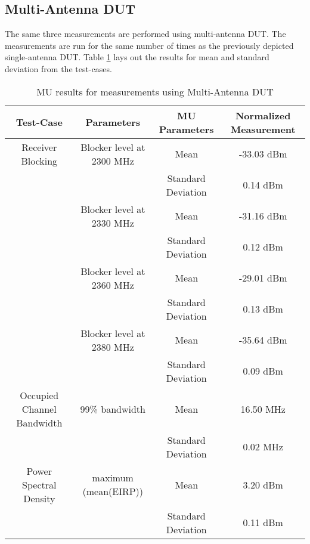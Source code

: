 \subsection{Multi-Antenna \acs{DUT}}
The same three measurements are performed using multi-antenna \acs{DUT}. The measurements are run for the same number of times as the previously depicted single-antenna \acs{DUT}. Table \ref{tab:Tab4} lays out the results for mean and standard deviation from the test-cases.
\begin{table}[H]
\resizebox{\textwidth}{!}
{
        \begin{tabular}{|c|c|c|c|}\toprule
         \textbf{Test-Case} & Parameters & \textbf{MU Parameters} & \textbf{Normalized Measurement} \\
            \midrule
           Receiver Blocking & Blocker level at 2300 MHz & Mean     & -33.03 dBm \\
                         &    & Standard Deviation & 0.14 dBm     \\

          &  Blocker level at 2330 MHz & Mean     & -31.16 dBm       \\
                     &        & Standard Deviation & 0.12 dBm    \\

          & Blocker level at 2360 MHz & Mean       & -29.01 dBm    \\
                          &   & Standard Deviation & 0.13 dBm      \\
                           
          & Blocker level at 2380 MHz & Mean      & -35.64 dBm    \\
                       &      & Standard Deviation & 0.09 dBm     \\
                       \midrule
                      
          Occupied Channel Bandwidth & 99\% bandwidth & Mean & 16.50 MHz \\
           &  & Standard Deviation & 0.02 MHz \\
           
           \midrule
           Power Spectral Density &   maximum (mean(EIRP)) & Mean &  3.20 dBm \\
           & & Standard Deviation & 0.11 dBm \\          
           \bottomrule
        \end{tabular}}
        \caption{\acf{MU} results for measurements using Multi-Antenna \acs{DUT}}\label{tab:Tab4}
 \end{table} 

